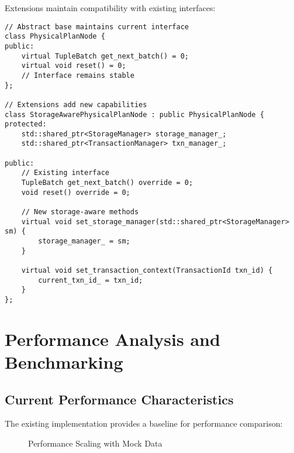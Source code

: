 \documentclass[12pt,a4paper]{article}
\begin{document}
Extensions maintain compatibility with existing interfaces:

\begin{lstlisting}[style=cpp, caption=Interface Compatibility Design]
// Abstract base maintains current interface
class PhysicalPlanNode {
public:
    virtual TupleBatch get_next_batch() = 0;
    virtual void reset() = 0;
    // Interface remains stable
};

// Extensions add new capabilities
class StorageAwarePhysicalPlanNode : public PhysicalPlanNode {
protected:
    std::shared_ptr<StorageManager> storage_manager_;
    std::shared_ptr<TransactionManager> txn_manager_;
    
public:
    // Existing interface
    TupleBatch get_next_batch() override = 0;
    void reset() override = 0;
    
    // New storage-aware methods
    virtual void set_storage_manager(std::shared_ptr<StorageManager> sm) {
        storage_manager_ = sm;
    }
    
    virtual void set_transaction_context(TransactionId txn_id) {
        current_txn_id_ = txn_id;
    }
};
\end{lstlisting}

\section{Performance Analysis and Benchmarking}

\subsection{Current Performance Characteristics}

The existing implementation provides a baseline for performance comparison:

\begin{figure}[htbp]
\centering
{}
\caption{Performance Scaling with Mock Data}
\label{fig:performance}
\end{figure}
\end{document}
